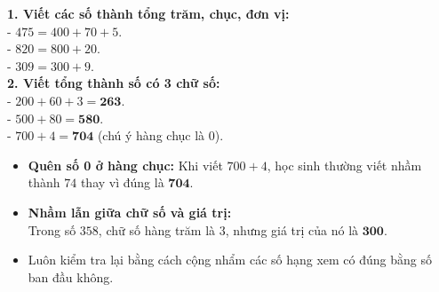 \documentclass[10pt,a4paper]{article}
\begin{document}
\vspace{-1.5mm}
\noindent
\begin{minipage}[t]{0.49\textwidth}\vspace{0pt}
\begin{tcolorbox}[
  enhanced,
  colback=green!4!white,
  colframe=green!60!black,
  arc=2mm, boxrule=0.8pt,
  left=2mm, right=2mm, top=1.8mm, bottom=1.8mm,
  title={\footnotesize\bfseries\color{white}\faCheckCircle\ 4. Ví dụ mẫu vận dụng}
]
{\footnotesize
\textbf{1. Viết các số thành tổng trăm, chục, đơn vị:}\\
- $475 = 400 + 70 + 5$.\\
- $820 = 800 + 20$.\\
- $309 = 300 + 9$.\\
\textbf{2. Viết tổng thành số có 3 chữ số:}\\
- $200 + 60 + 3 = \mathbf{263}$.\\
- $500 + 80 = \mathbf{580}$.\\
- $700 + 4 = \mathbf{704}$ (chú ý hàng chục là $0$).
}
\end{tcolorbox}
\end{minipage}
\hfill
\begin{minipage}[t]{0.49\textwidth}\vspace{0pt}
\begin{tcolorbox}[
  enhanced,
  colback=rose!4!white,
  colframe=rose!70!black,
  arc=2mm, boxrule=0.8pt,
  left=2mm, right=2mm, top=1.8mm, bottom=1.8mm,
  title={\footnotesize\bfseries\color{white}\faExclamationTriangle\ 5. Lỗi sai học sinh hay mắc}
]
{\footnotesize
\begin{itemize}\setlength{\itemsep}{1.5pt}\setlength{\leftskip}{-2.5mm}
  \item \textbf{Quên số 0 ở hàng chục:} Khi viết $700 + 4$, học sinh thường viết nhầm thành $74$ thay vì đúng là $\mathbf{704}$.
  \item \textbf{Nhầm lẫn giữa chữ số và giá trị:}\\
  Trong số $358$, chữ số hàng trăm là $3$, nhưng giá trị của nó là $\mathbf{300}$.
  \item Luôn kiểm tra lại bằng cách cộng nhẩm các số hạng xem có đúng bằng số ban đầu không.
\end{itemize}
}
\end{tcolorbox}
\end{minipage}
\end{document}
